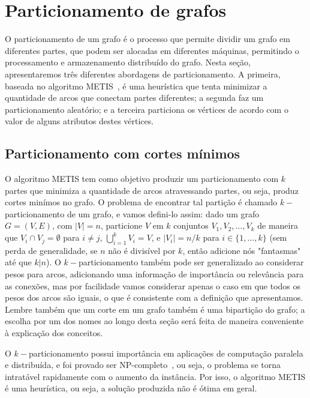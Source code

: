 \documentclass[conference]{IEEEtran}
\begin{document}
\section{Particionamento de grafos}
O particionamento de um grafo é o processo que permite dividir um grafo
em diferentes partes, que podem ser alocadas em diferentes máquinas, 
permitindo o processamento e armazenamento distribuído do grafo. Nesta
seção, apresentaremos três diferentes abordagens de particionamento.
A primeira, baseada no algoritmo METIS~\cite{metis}, é uma heurística
que tenta minimizar a quantidade de arcos que conectam partes 
diferentes; a segunda faz um particionamento aleatório; e a terceira 
particiona os vértices de acordo com o valor de alguns atributos destes
vértices.

\subsection{Particionamento com cortes mínimos}
O algoritmo METIS tem como objetivo produzir um particionamento com
$k$ partes que minimiza a quantidade de arcos atravessando partes, ou 
seja, produz cortes minímos no grafo. O problema de encontrar tal 
partição é chamado $k-$particionamento de um grafo, e vamos defini-lo 
assim: dado um grafo $G = (V, E)$, com $|V| = n$, particione $V$ em $k$ 
conjuntos $V_1, V_2, \ldots, V_k$ de maneira que 
$V_i \cap V_j = \emptyset$ para $i \neq j$, $\bigcup_{i = 1}^k V_i = V$, 
e $|V_i| = n / k$ para $i \in \{1, \ldots, k\}$ (sem perda de 
generalidade, se $n$ não é divisível por $k$, então adicione nós 
"fantasmas" até que $k | n$). O $k-$particionamento também pode ser 
generalizado ao considerar pesos para arcos, adicionando uma informação 
de importância ou relevância para as conexões, mas por facilidade vamos 
considerar apenas o caso em que todos os pesos dos arcos são iguais, o 
que é consistente com a definição que apresentamos. Lembre também que
um corte em um grafo também é uma bipartição do grafo; a escolha por um
dos nomes ao longo desta seção será feita de maneira conveniente à
explicação dos conceitos.

O $k-$particionamento possui importância em aplicações de computação 
paralela e distribuída, e foi provado ser 
NP-completo~\cite{graphpartitioning}, ou seja, o problema se torna 
intratável rapidamente com o aumento da instância. Por isso, o algoritmo 
METIS é uma heurística, ou seja, a solução produzida não é ótima em 
geral. 
\end{document}
